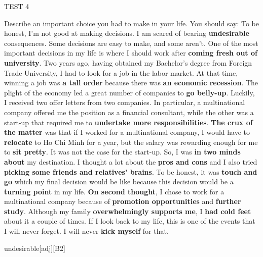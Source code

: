 \begin{glossarymc}[Cambridge 6]
\begin{test}{TEST 4}
\begin{qa}{Describe an important choice you had to make in your life. You should say:}
    To be honest, I'm not good at making decisions. I am scared of bearing \textbf{undesirable} consequences. Some decisions are easy to make, and some aren't. One of the most important decisions in my life is where I should work after \textbf{coming fresh out of university}. Two years ago, having obtained my Bachelor's degree from Foreign Trade University, I had to look for a job in the labor market. At that time, winning a job was \textbf{a tall order} because there was \textbf{an economic recession}. The plight of the economy led a great number of companies to \textbf{go belly-up}. Luckily, I received two offer letters from two companies. In particular, a multinational company offered me the position as a financial consultant, while the other was a start-up that required me to \textbf{undertake more responsibilities}. \textbf{The crux of the matter} was that if I worked for a multinational company, I would have to \textbf{relocate} to Ho Chi Minh for a year, but the salary was rewarding enough for me to \textbf{sit pretty}. It was not the case for the start-up. So, I was \textbf{in two minds about} my destination. I thought a lot about the \textbf{pros and cons} and I also tried \textbf{picking some friends and relatives' brains}. To be honest, it was \textbf{touch and go} which my final decision would be like because this decision would be a \textbf{turning point} in my life. \textbf{On second thought}, I chose to work for a multinational company because of \textbf{promotion opportunities} and \textbf{further study}. Although my family \textbf{overwhelmingly supports me}, I \textbf{had cold feet} about it a couple of times. If I look back to my life, this is one of the events that I will never forget. I will never \textbf{kick myself} for that.
    \end{qa}


        \begin{VocabExplain}[Part 2]
            \begin{ExplainCard}{undesirable}[adj][B2]
            \end{ExplainCard}


\end{VocabExplain}
\end{test}
\end{glossarymc}
